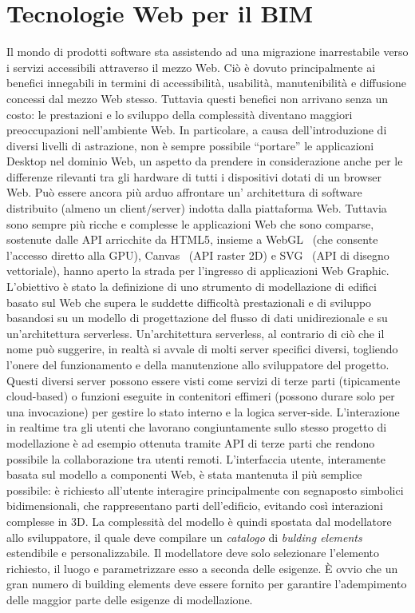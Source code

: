 
\section{Tecnologie Web per il BIM}
\label{sec:chapter_1_section_3}

Il mondo di prodotti software sta assistendo ad una migrazione inarrestabile verso i servizi accessibili
attraverso il mezzo Web. Ciò è dovuto principalmente ai benefici innegabili in termini di accessibilità, usabilità,
manutenibilità e diffusione concessi dal mezzo Web stesso.
Tuttavia questi benefici non arrivano senza un costo: le prestazioni e lo sviluppo della complessità diventano
maggiori preoccupazioni nell'ambiente Web.
In particolare, a causa dell'introduzione di diversi livelli di astrazione, non è sempre possibile ``portare'' le
applicazioni Desktop nel dominio Web, un aspetto da prendere in considerazione anche per le differenze rilevanti
tra gli hardware di tutti i dispositivi dotati di un browser Web.
Può essere ancora più arduo affrontare un' architettura di software distribuito (almeno un client/server)
indotta dalla piattaforma Web. Tuttavia sono sempre più ricche e complesse le applicazioni Web che sono comparse,
sostenute dalle API arricchite da HTML5, insieme a WebGL~\cite{webgl}
(che consente l'accesso diretto alla GPU), Canvas~\cite{Munro:15:HCC} (API raster 2D) e SVG~\cite{Jackson:11:SVG}
(API di disegno vettoriale), hanno aperto la strada per l'ingresso di applicazioni Web Graphic.
L'obiettivo è stato la definizione di uno strumento di modellazione di edifici basato sul Web
che supera le suddette difficoltà prestazionali e di sviluppo basandosi su un modello di progettazione del flusso di dati
unidirezionale e su un'architettura serverless.
Un'architettura serverless, al contrario di ciò che il nome può suggerire, in realtà si avvale di molti server specifici
diversi, togliendo l'onere del funzionamento e della manutenzione allo sviluppatore del progetto.
Questi diversi server possono essere visti come servizi di terze parti (tipicamente cloud-based) o funzioni eseguite
in contenitori effimeri (possono durare solo per una invocazione) per gestire lo stato interno e la logica server-side.
L'interazione in realtime tra gli utenti che lavorano congiuntamente sullo stesso progetto di modellazione
è ad esempio ottenuta tramite API di terze parti che rendono possibile la collaborazione tra utenti remoti.
L'interfaccia utente, interamente basata sul modello a componenti Web, è stata mantenuta il più semplice possibile:
è richiesto all'utente interagire principalmente con segnaposto simbolici bidimensionali, che rappresentano parti dell'edificio,
evitando così interazioni complesse in 3D.
La complessità del modello è quindi spostata dal modellatore allo sviluppatore, il quale deve compilare un \emph{catalogo} di
\emph{bulding elements} estendibile e personalizzabile. Il modellatore deve solo selezionare l'elemento richiesto,
il luogo e parametrizzare esso a seconda delle esigenze. È ovvio che un gran numero di building elements deve essere fornito
per garantire l'adempimento delle maggior parte delle esigenze di modellazione.

